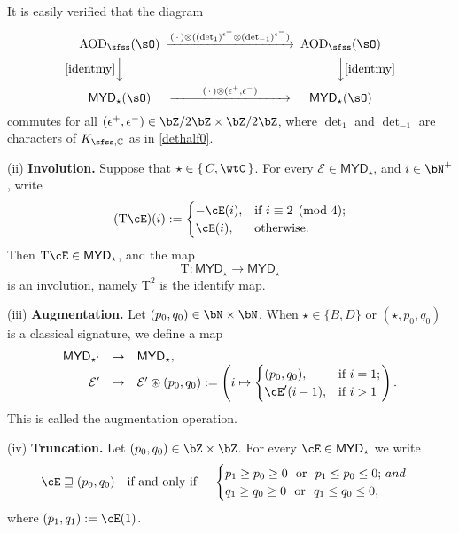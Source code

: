 \documentclass[11pt,a4paper]{amsart}
\def\MYD{{\mathsf{MYD}}}
\newcommand{\CE}{{\mathcal {E}}}
\newcommand{\be}{\begin {equation}}
\newcommand{\ee}{\end {equation}}
\numberwithin{equation}{section}
\theoremstyle{remark}
\def\maltese{\mathrm{T}}
\def\MYD{{\mathsf{MYD}}}
\def\AOD{\mathrm{AOD}}
\begin{document}
It is easily verified that the diagram
\[
 \begin{CD}
       \AOD_{\sfss}(\sO)
                  @>  (\,\cdot\,) \otimes((\det_1)^{\epsilon^+}\otimes (\det_{-1})^{\epsilon^-}) >>  \AOD_{\sfss}(\sO)\\
            @V  \eqref{identmy}  VV         @ VV  \eqref{identmy} V \\
     \MYD_\star (\sO)
                  @>\qquad \ (\,\cdot\,)  \otimes(\epsilon^{+},\epsilon^{-})\ \qquad  >>  \MYD_\star (\sO)
  \end{CD}
\]
commutes for all $(\epsilon^{+},\epsilon^{-})\in \bZ/2\bZ\times \bZ/2\bZ$, where $\det_{1}$ and $\det_{-1}$ are characters of $K_{\sfss,\C}$ as in \eqref{dethalf0}.



\medskip
(ii) {\bf  Involution.}
Suppose that $\star\in \set{C,\wtC}$. For every $\CE\in \MYD_{\star}$, and $i\in \bN^+$, write
\begin{equation}\label{eq:inv}
(\maltese\cE)(i) := \begin{cases}
  -\cE(i),& \text{if $i\equiv 2 \pmod{4}$;}\\
  \cE(i), & \text{otherwise.}
\end{cases}
\end{equation}
Then $\maltese\cE\in \MYD_{\star}$, and the map
\be\label{tinv}
  \mathrm T: \MYD_{\star}\rightarrow \MYD_{\star}
  \ee
  is an involution, namely $\mathrm T^2$ is the identify map.

\medskip

(iii) {\bf  Augmentation.}
Let $(p_{0},q_{0})\in \bN\times \bN$. When $\star\in \{B,D\}$ or
$ (\star,p_{0},q_{0})$ is a classical signature, we define a map
\be\label{aug}
  \begin{array}{rcl}
  \MYD_{\star'}&\rightarrow & \MYD_{\star},\\
  \CE'&\mapsto & \CE'\circledast (p_0,q_0):=\left(i\mapsto \begin{cases}
    (p_0,q_0), & \text{if } i=1;\\
    \cE'(i-1), & \text{if } i>1
  \end{cases}\right).
  \end{array}
\ee
This is called the augmentation operation.

\medskip

(iv) {\bf  Truncation.}
Let $(p_{0},q_{0})\in \bZ\times \bZ$. For  every $\cE\in \MYD_{\star}$
we write
\begin{equation}
  \label{eq:sub}
  \cE\sqsupseteq (p_{0},q_{0}) \quad \textrm{if and only if } \quad
  \begin{cases}
  p_{1}\geq p_0 \geq 0  \ \text{ or }\
  p_{1}\leq p_0 \leq 0; $\ $ and \\
  q_{1}\geq q_0 \geq 0 \  \text{ or } \
  q_{1}\leq q_0 \leq 0, \\
  \end{cases}
\end{equation}
where $ (p_{1},q_{1}):=\cE(1)$.
\end{document}
